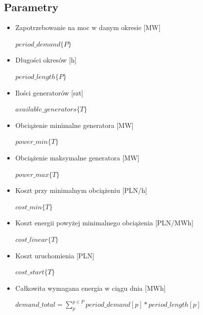 \documentclass[12pt, twoside, hidelinks, a4paper]{article}
\begin{document}
\subsection{Parametry}
\begin{itemize}
\item Zapotrzebowanie na moc w danym okresie [MW]

$period\_demand \{P\}$
\item Długości okresów [h]

$period\_length \{P\}$
\item Ilości generatorów [szt]

$available\_generators \{T\}$
\item Obciążenie minimalne generatora [MW]

$power\_min \{T\}$
\item Obciążenie maksymalne generatora [MW]

$power\_max \{T\}$ 
\item Koszt przy minimalnym obciążeniu [PLN/h]

$cost\_min \{T\}$ 
\item Koszt energii powyżej minimalnego obciążenia [PLN/MWh]

$cost\_linear \{T\}$ 
\item Koszt uruchomienia [PLN]

$cost\_start \{T\}$
\item Całkowita wymagana energia w ciągu dnia [MWh]

$demand\_total = \sum_{p}^{p \in P} period\_demand[p] * period\_length[p]$
\end{itemize}
\end{document}
